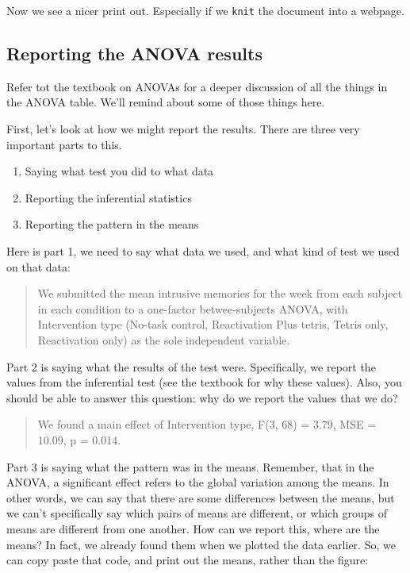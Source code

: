 \documentclass[
]{book}
\providecommand{\tightlist}{%
  \setlength{\itemsep}{0pt}\setlength{\parskip}{0pt}}
\begin{document}
Now we see a nicer print out. Especially if we \texttt{knit} the document into a webpage.

\hypertarget{reporting-the-anova-results}{%
\subsection{Reporting the ANOVA results}\label{reporting-the-anova-results}}

Refer tot the textbook on ANOVAs for a deeper discussion of all the things in the ANOVA table. We'll remind about some of those things here.

First, let's look at how we might report the results. There are three very important parts to this.

\begin{enumerate}
\def\labelenumi{\arabic{enumi}.}
\tightlist
\item
  Saying what test you did to what data
\item
  Reporting the inferential statistics
\item
  Reporting the pattern in the means
\end{enumerate}

Here is part 1, we need to say what data we used, and what kind of test we used on that data:

\begin{quote}
We submitted the mean intrusive memories for the week from each subject in each condition to a one-factor betwee-subjects ANOVA, with Intervention type (No-task control, Reactivation Plus tetris, Tetris only, Reactivation only) as the sole independent variable.
\end{quote}

Part 2 is saying what the results of the test were. Specifically, we report the values from the inferential test (see the textbook for why these values). Also, you should be able to answer this question: why do we report the values that we do?

\begin{quote}
We found a main effect of Intervention type, F(3, 68) = 3.79, MSE = 10.09, p = 0.014.
\end{quote}

Part 3 is saying what the pattern was in the means. Remember, that in the ANOVA, a significant effect refers to the global variation among the means. In other words, we can say that there are some differences between the means, but we can't specifically say which pairs of means are different, or which groups of means are different from one another. How can we report this, where are the means? In fact, we already found them when we plotted the data earlier. So, we can copy paste that code, and print out the means, rather than the figure:
\end{document}
